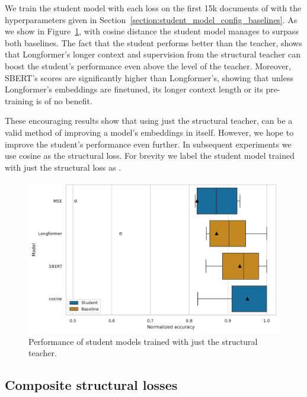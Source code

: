 We train the student model with each loss on the first 15k documents of
 with the hyperparameters given in
Section~\ref{section:student_model_config_baselines}. As we show in
Figure~\ref{fig:structural_basic}, with cosine distance the student model
manages to surpass both baselines. The fact that the student performs better
than the teacher, shows that Longformer's longer context and supervision from
the structural teacher can boost the student's performance even above the level
of the teacher. Moreover, SBERT's scores are significantly higher than
Longformer's, showing that unless Longformer's embeddings are finetuned, its
longer context length or its pre-training is of no benefit.

These encouraging results show that using just the structural teacher, can be a
valid method of improving a model's embeddings in itself. However, we hope to
improve the student's performance even further. In subsequent experiments we
use cosine as the structural loss. For brevity we label the student model
trained with just the structural loss as .

\begin{figure}
  \includegraphics[width=\textwidth]{img/structural_simple_losses.pdf}

  \caption{Performance of student models trained with just the structural
  teacher.}

  \label{fig:structural_basic}
\end{figure}

\subsection{Composite structural losses}\label{section:composite_losses}

